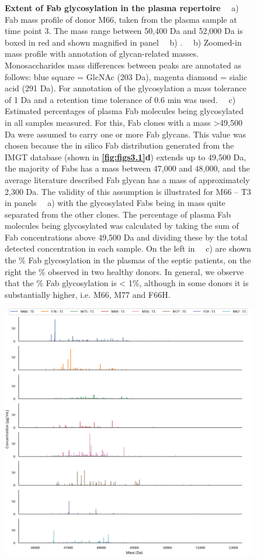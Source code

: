 \begin{subappendices}
\begin{figure}[pt!]
{      \textbf{Extent of Fab glycosylation in the plasma repertoire} ~~a) Fab mass profile of donor M66, taken from the plasma sample at time point 3. The mass range between 50,400 Da and 52,000 Da is boxed in red and shown magnified in panel ~~b) . ~~b) Zoomed-in mass profile with annotation of glycan-related masses. Monosaccharides mass differences between peaks are annotated as follows: blue square = GlcNAc (203 Da), magenta diamond = sialic acid (291 Da). For annotation of the glycosylation a mass tolerance of 1 Da and a retention time tolerance of 0.6 min was used. ~~c) Estimated percentages of plasma Fab molecules being glycosylated in all samples measured. For this, Fab clones with a mass >49,500 Da were assumed to carry one or more Fab glycans. This value was chosen because the in silico Fab distribution generated from the IMGT database (shown in \textbf{\autoref{fig:figs3.1}d}) extends up to 49,500 Da, the majority of Fabs has a mass between 47,000 and 48,000, and the average literature described Fab glycan has a mass of approximately 2,300 Da. The validity of this assumption is illustrated for M66 – T3 in panels ~~a) with the glycosylated Fabs being in mass quite separated from the other clones. The percentage of plasma Fab molecules being glycosylated was calculated by taking the sum of Fab concentrations above 49,500 Da and dividing these by the total detected concentration in each sample. On the left in ~~c) are shown the \% Fab glycosylation in the plasmas of the septic patients, on the right the \% observed in two healthy donors. In general, we observe that the \% Fab glycosylation is < 1\%, although in some donors it is substantially higher, i.e. M66, M77 and F66H.
    }
    \vspace{24cm}
  \end{figure}
  \begin{figure}[!hbt]
    \center
    \includegraphics[]{Chapter.3/Figures/fs3.png}

\end{figure}
\end{subappendices}
